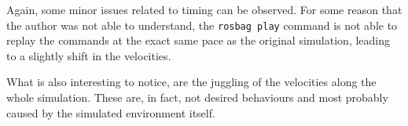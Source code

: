 Again, some minor issues related to timing can be observed.
For some reason that the author was not able to understand, the \texttt{rosbag play} command is not able to replay the commands at the exact same pace as the original simulation, leading to a slightly shift in the velocities.

What is also interesting to notice, are the juggling of the velocities along the whole simulation.
These are, in fact, not desired behaviours and most probably caused by the simulated environment itself.